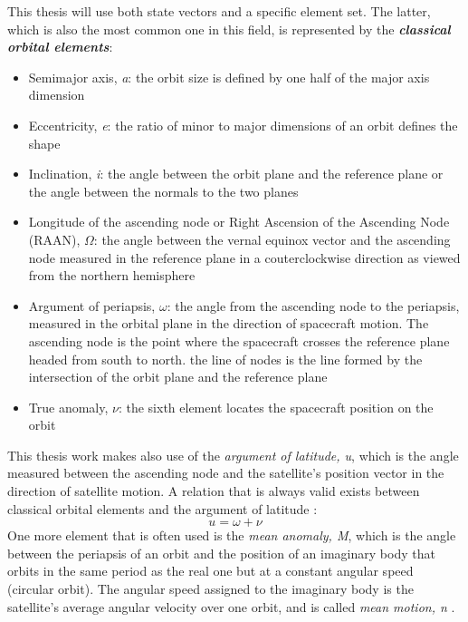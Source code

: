 This thesis will use both state vectors and a specific element set.
The latter, which is also the most common one in this field, is represented by the \textit{\textbf{classical orbital elements}}:
\begin{itemize}
    \item Semimajor axis, \textit{a}: the orbit size is defined by one half of the major axis dimension
    \item Eccentricity, \textit{e}: the ratio of minor to major dimensions of an orbit defines the shape
    \item Inclination, \textit{i}: the angle between the orbit plane and the reference plane or the angle between the normals to the two planes
    \item Longitude of the ascending node or Right Ascension of the Ascending Node (RAAN), $\Omega$: the angle between the vernal equinox vector and the ascending node measured in the reference plane in a couterclockwise direction as viewed from the northern hemisphere
    \item Argument of periapsis, $\omega$: the angle from the ascending node to the periapsis, measured in the orbital plane in the direction of spacecraft motion. The ascending node is the point where the spacecraft crosses the reference plane headed from south to north. the line of nodes is the line formed by the intersection of the orbit plane and the reference plane
    \item True anomaly, $\nu$: the sixth element locates the spacecraft position on the orbit
\end{itemize}
\cite{brown1998spacecraft}

This thesis work makes also use of the \textit{argument of latitude, u}, which is the angle measured between the ascending node and the satellite's position vector in the direction of satellite motion.
A relation that is always valid exists between classical orbital elements and the argument of latitude \cite{vallado2013fundamentals}:
\begin{equation} \label{eq:argl}
    u = \omega + \nu
\end{equation}
One more element that is often used is the \textit{mean anomaly, M}, which is the angle between the periapsis of an orbit and the position of an imaginary body that orbits in the same period as the real one but at a constant angular speed (circular orbit).
The angular speed assigned to the imaginary body is the satellite's average angular velocity over one orbit, and is called \textit{mean motion, n} \cite{ridpath2012dictionary}.

